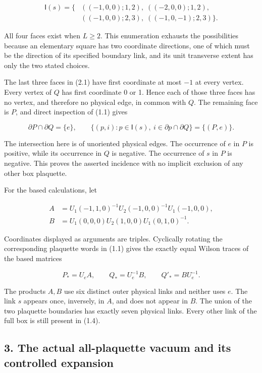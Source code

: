 \[
\begin{split}
\mathsf I(s)=\{&((-1,0,0);1,2),\;((-2,0,0);1,2),\\
              &((-1,0,0);2,3),\;((-1,0,-1);2,3)\}.
\end{split}
\tag{2.1}
\]

All four faces exist when \(L\geq2\). This enumeration exhausts the
possibilities because an elementary square has two coordinate
directions, one of which must be the direction of its specified boundary
link, and its unit transverse extent has only the two stated choices.

The last three faces in (2.1) have first coordinate at most \(-1\) at
every vertex. Every vertex of \(Q\) has first coordinate 0 or 1. Hence
each of those three faces has no vertex, and therefore no physical edge,
in common with \(Q\). The remaining face is \(P\), and direct inspection
of (1.1) gives

\[
\partial P\cap\partial Q=\{e\},\qquad
\{(p,i):p\in\mathsf I(s),\ i\in\partial p\cap\partial Q\}
=\{(P,e)\}.
\tag{2.2}
\]

The intersection here is of unoriented physical edges. The occurrence of
\(e\) in \(P\) is positive, while its occurrence in \(Q\) is negative.
The occurrence of \(s\) in \(P\) is negative. This proves the asserted
incidence with no implicit exclusion of any other box plaquette.

For the based calculations, let

\[
\begin{split}
A&=U_1(-1,1,0)^{-1}U_2(-1,0,0)^{-1}U_1(-1,0,0),\\
B&=U_1(0,0,0)U_2(1,0,0)U_1(0,1,0)^{-1}.
\end{split}
\tag{2.3}
\]

Coordinates displayed as arguments are triples. Cyclically rotating the
corresponding plaquette words in (1.1) gives the exactly equal Wilson
traces of the based matrices

\[
P_*=U_eA,\qquad Q_*=U_e^{-1}B,\qquad Q'_*=BU_e^{-1}.
\tag{2.4}
\]

The products \(A,B\) use six distinct outer physical links and neither
uses \(e\). The link \(s\) appears once, inversely, in \(A\), and does
not appear in \(B\). The union of the two plaquette boundaries has
exactly seven physical links. Every other link of the full box is still
present in (1.4).

\subsection{3. The actual all-plaquette vacuum and its controlled
expansion}\label{bulk-the-actual-all-plaquette-vacuum-and-its-controlled-expansion}

